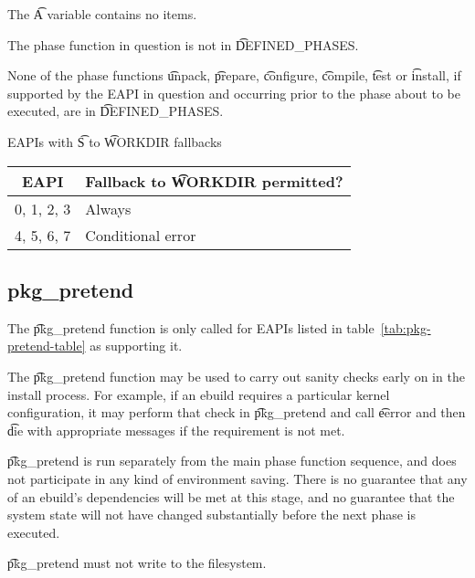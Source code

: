 \begin{compactitem}
\item The \t{A} variable contains no items.
\item The phase function in question is not in \t{DEFINED_PHASES}.
\item None of the phase functions \t{unpack}, \t{prepare}, \t{configure}, \t{compile}, \t{test} or
    \t{install}, if supported by the EAPI in question and occurring prior to the phase about to be
    executed, are in \t{DEFINED_PHASES}.
\end{compactitem}

\begin{centertable}{EAPIs with \t{S} to \t{WORKDIR} fallbacks}
    \label{tab:s-fallback-table}
    \begin{tabular}{ll}
      \toprule
      \multicolumn{1}{c}{\textbf{EAPI}} &
      \multicolumn{1}{c}{\textbf{Fallback to \t{WORKDIR} permitted?}} \\
      \midrule
      0, 1, 2, 3        & Always            \\
      4, 5, 6, 7        & Conditional error \\
      \bottomrule
    \end{tabular}
\end{centertable}

\subsection{pkg_pretend}

 The \t{pkg_pretend} function is only called for EAPIs listed in
table~\ref{tab:pkg-pretend-table} as supporting it.

The \t{pkg_pretend} function may be used to carry out sanity checks early on in the install
process. For example, if an ebuild requires a particular kernel configuration, it may perform that
check in \t{pkg_pretend} and call \t{eerror} and then \t{die} with appropriate messages if the
requirement is not met.

\t{pkg_pretend} is run separately from the main phase function sequence, and does not participate
in any kind of environment saving. There is no guarantee that any of an ebuild's dependencies will
be met at this stage, and no guarantee that the system state will not have changed substantially
before the next phase is executed.

\t{pkg_pretend} must not write to the filesystem.

